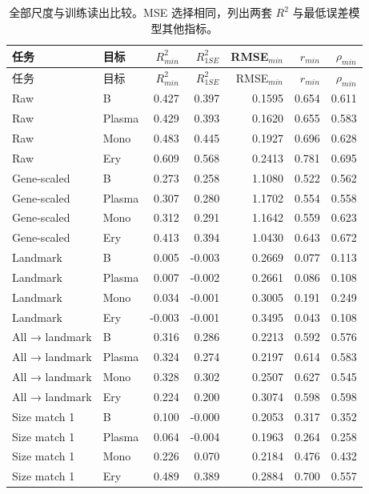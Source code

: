 {\footnotesize\linespread{1}\selectfont\setlength{\tabcolsep}{4pt}\renewcommand{\arraystretch}{1.08}\begin{longtable}{llrrrrr}\caption{全部尺度与训练读出比较。MSE 选择相同，列出两套 $R^2$ 与最低误差模型其他指标。}\\\toprule 任务 & 目标 & $R^2_{min}$ & $R^2_{1SE}$ & RMSE$_{min}$ & $r_{min}$ & $\rho_{min}$\\\midrule\endfirsthead\toprule 任务 & 目标 & $R^2_{min}$ & $R^2_{1SE}$ & RMSE$_{min}$ & $r_{min}$ & $\rho_{min}$\\\midrule\endhead
Raw & B & 0.427 & 0.397 & 0.1595 & 0.654 & 0.611\\
Raw & Plasma & 0.429 & 0.393 & 0.1620 & 0.655 & 0.583\\
Raw & Mono & 0.483 & 0.445 & 0.1927 & 0.696 & 0.628\\
Raw & Ery & 0.609 & 0.568 & 0.2413 & 0.781 & 0.695\\
Gene-scaled & B & 0.273 & 0.258 & 1.1080 & 0.522 & 0.562\\
Gene-scaled & Plasma & 0.307 & 0.280 & 1.1702 & 0.554 & 0.558\\
Gene-scaled & Mono & 0.312 & 0.291 & 1.1642 & 0.559 & 0.623\\
Gene-scaled & Ery & 0.413 & 0.394 & 1.0430 & 0.643 & 0.672\\
Landmark & B & 0.005 & -0.003 & 0.2669 & 0.077 & 0.113\\
Landmark & Plasma & 0.007 & -0.002 & 0.2661 & 0.086 & 0.108\\
Landmark & Mono & 0.034 & -0.001 & 0.3005 & 0.191 & 0.249\\
Landmark & Ery & -0.003 & -0.001 & 0.3495 & 0.043 & 0.108\\
All → landmark & B & 0.316 & 0.286 & 0.2213 & 0.592 & 0.576\\
All → landmark & Plasma & 0.324 & 0.274 & 0.2197 & 0.614 & 0.583\\
All → landmark & Mono & 0.328 & 0.302 & 0.2507 & 0.627 & 0.545\\
All → landmark & Ery & 0.224 & 0.200 & 0.3074 & 0.598 & 0.598\\
Size match 1 & B & 0.100 & -0.000 & 0.2053 & 0.317 & 0.352\\
Size match 1 & Plasma & 0.064 & -0.004 & 0.1963 & 0.264 & 0.258\\
Size match 1 & Mono & 0.226 & 0.070 & 0.2184 & 0.476 & 0.432\\
Size match 1 & Ery & 0.489 & 0.389 & 0.2884 & 0.700 & 0.557\\

\end{longtable}}
